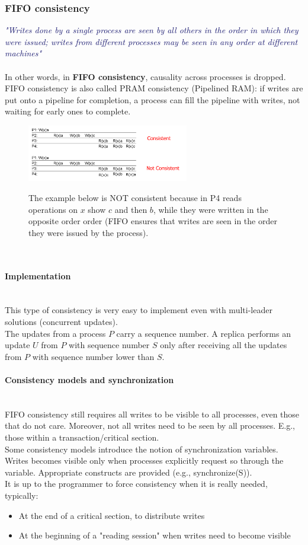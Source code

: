 \documentclass[10pt,a4paper]{article}
\newcommand{\myparagraph}[1]{\paragraph{#1}\mbox{}\\[0.05in]}
\newcommand{\mydefinition}[1]{\textcolor{MidnightBlue}{\textit{"#1"}\\ \\}}
\begin{document}
\subsubsection{FIFO consistency}
\mydefinition{Writes done by a single process are seen by all others in the order in which they were issued; writes from different processes may be seen in any order at different machines}
In other words, in \textbf{FIFO consistency}, causality across processes is dropped. FIFO consistency is also called PRAM consistency (Pipelined RAM): if writes are put onto a pipeline for completion, a process can fill the pipeline with writes, not waiting for early ones to complete.
\begin{figure}[h!]
 \hfill \includegraphics[width=200pt]{images/fifo.png}\hspace*{\fill}
  \label{fig:fifo}
  \caption{The example below  is NOT consistent because in P4 reads operations on $x$ show $c$ and then $b$, while they were written in the opposite order order (FIFO ensures that writes are seen in the order they were issued by the process).}
\end{figure} \\
\myparagraph{Implementation}
This type of consistency is very easy to implement even with multi-leader solutions (concurrent updates). \\
The updates from a process $P$ carry a sequence number. A replica performs an update $U$ from $P$ with sequence number $S$ only after receiving all the updates from $P$ with sequence number lower than $S$. \\
\myparagraph{Consistency models and synchronization}
FIFO consistency still requires all writes to be visible to all processes, even those that do not care. Moreover, not all writes need to be seen by all processes. E.g., those within a transaction/critical section. \\ Some consistency models introduce the notion of synchronization variables. Writes becomes visible only when processes explicitly request so through the variable. Appropriate constructs are provided (e.g., synchronize(S)). \\ It is up to the programmer to force consistency when it is really needed, typically:
\begin{itemize}
	\item At the end of a critical section, to distribute writes
	\item At the beginning of a "reading session" when writes need to become visible
\end{itemize}
\end{document}
